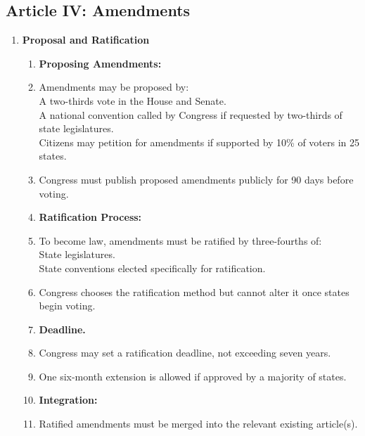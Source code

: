 \documentclass{article}
\begin{document}
\begin{multicols}{2}
\begin{enumerate}[label=\Alph*)]
\begin{enumerate}[label=\Alph*), start=4]
\newpage
\section*{Article IV: Amendments}

\begin{enumerate}[label=\Alph*), start=14]
    \item \textbf{Proposal and Ratification}
    
    \begin{enumerate}[label=4.1.\arabic*]
        \item[] \textbf{Proposing Amendments:}
        \item Amendments may be proposed by: \\
        A two-thirds vote in the House and Senate. \\
        A national convention called by Congress if requested by two-thirds of state legislatures. \\
        Citizens may petition for amendments if supported by 10\% of voters in 25 states.
        
        \item Congress must publish proposed amendments publicly for 90 days before voting.
        
        \item[] \textbf{Ratification Process:}
        \item To become law, amendments must be ratified by three-fourths of: \\
        State legislatures. \\
        State conventions elected specifically for ratification.
        
        \item Congress chooses the ratification method but cannot alter it once states begin voting.
        
        \item[] \textbf{Deadline.}
        \item Congress may set a ratification deadline, not exceeding seven years.
        
        \item One six-month extension is allowed if approved by a majority of states.
        
        \item[] \textbf{Integration:}
        \item Ratified amendments must be merged into the relevant existing article(s).
        

\end{enumerate}
\end{enumerate}
\end{enumerate}
\end{enumerate}
\end{multicols}
\end{document}
